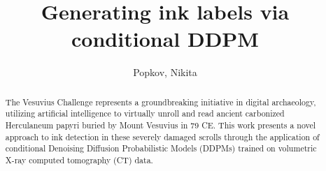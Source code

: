 \documentclass[runningheads]{llncs}
\begin{document}
%
\title{Generating ink labels via conditional DDPM}
%
\author{Popkov, Nikita}
%
%
%
\maketitle 
\begin{abstract}
The Vesuvius Challenge represents a groundbreaking initiative in digital archaeology, utilizing artificial intelligence to virtually unroll and read ancient carbonized Herculaneum papyri buried by Mount Vesuvius in 79 CE. This work presents a novel approach to ink detection in these severely damaged scrolls through the application of conditional Denoising Diffusion Probabilistic Models (DDPMs) trained on volumetric X-ray computed tomography (CT) data.
%
\end{abstract}
\end{document}
